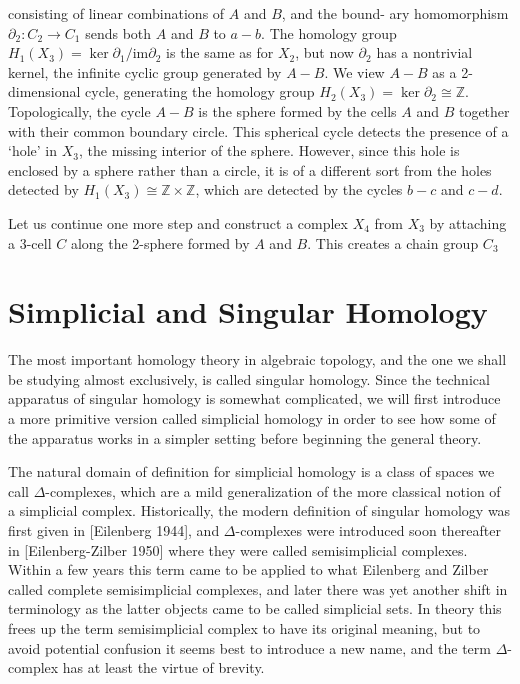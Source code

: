 consisting of linear combinations of $A$ and $B$, and the bound-
ary homomorphism $\partial_2: C_2 \to C_1$ sends both $A$ and $B$ to $a-b$.
The homology group $H_1(X_3) = \ker \partial_1 / \text{im} \partial_2$ is the same as
for $X_2$, but now $\partial_2$ has a nontrivial kernel, the infinite cyclic
group generated by $A - B$. We view $A - B$ as a 2-dimensional
cycle, generating the homology group $H_2(X_3) = \ker \partial_2 \cong \mathbb{Z}$.
Topologically, the cycle $A - B$ is the sphere formed by the cells $A$ and $B$ together
with their common boundary circle. This spherical cycle detects the presence of a
`hole' in $X_3$, the missing interior of the sphere. However, since this hole is enclosed
by a sphere rather than a circle, it is of a different sort from the holes detected by
$H_1(X_3) \cong \mathbb{Z} \times \mathbb{Z}$, which are detected by the cycles $b - c$ and $c - d$.

Let us continue one more step and construct a complex $X_4$ from $X_3$ by attaching
a 3-cell $C$ along the 2-sphere formed by $A$ and $B$. This creates a chain group $C_3$

\section{Simplicial and Singular Homology}

The most important homology theory in algebraic topology, and the one we shall be studying almost exclusively, is called singular homology. Since the technical apparatus of singular homology is somewhat complicated, we will first introduce a more primitive version called simplicial homology in order to see how some of the apparatus works in a simpler setting before beginning the general theory.

The natural domain of definition for simplicial homology is a class of spaces we call $\Delta$-complexes, which are a mild generalization of the more classical notion of a simplicial complex. Historically, the modern definition of singular homology was first given in [Eilenberg 1944], and $\Delta$-complexes were introduced soon thereafter in [Eilenberg-Zilber 1950] where they were called semisimplicial complexes. Within a few years this term came to be applied to what Eilenberg and Zilber called complete semisimplicial complexes, and later there was yet another shift in terminology as the latter objects came to be called simplicial sets. In theory this frees up the term semisimplicial complex to have its original meaning, but to avoid potential confusion it seems best to introduce a new name, and the term $\Delta$-complex has at least the virtue of brevity.

